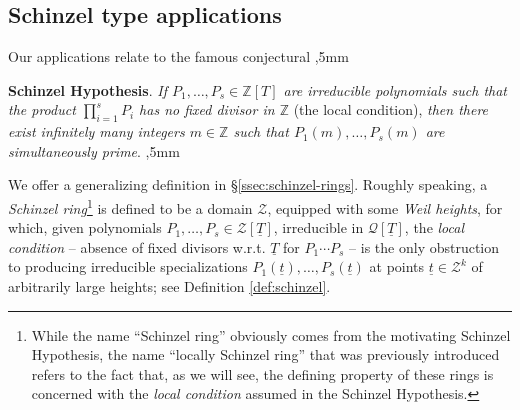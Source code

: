 \documentclass[11pt,a4paper,reqno]{amsart}
\def\Z{\mathbb{Z}}
\theoremstyle{definition}
\begin{document}
{\subsection{Schinzel type applications} Our applications relate to the famous conjectural 
,5mm

 \noindent
 {\bf Schinzel Hypothesis}.  \emph{If $P_1,\ldots,P_s\in \Z[T]$ are irreducible polynomials such that the product $\prod_{i=1}^s P_i$ has no fixed divisor in $\Z$} (the local condition), \emph{then there exist infinitely many integers $m\in \Z$ such that $P_1(m),\ldots,P_s(m)$ are simultaneously prime}. 
,5mm

We offer a generalizing definition in \S \ref{ssec:schinzel-rings}.
Roughly speaking, a \emph{Schinzel ring}\footnote{While the name ``Schinzel ring'' obviously comes from the motivating Schinzel Hypothesis, the name ``locally Schinzel ring'' that was previously introduced refers to the fact that, as we will see, the defining property of these rings is concerned with the \emph{local condition} assumed in the Schinzel Hypothesis.} is defined to be a domain ${\mathcal Z}$, equipped with some \emph{Weil heights}, for which, given polynomials $P_1,\ldots,P_s \in {\mathcal Z}[\underline T]$, irreducible in $\mathcal{Q}[\underline T]$, the \emph{local condition} -- absence of fixed divisors \hbox{w.r.t.} $\underline T$ for $P_1\cdots P_s$ -- is the only obstruction to producing irreducible specializations $P_1(\underline t), \ldots, P_s(\underline t)$ at points $\underline t\in {\mathcal Z}^k$ of arbitrarily large heights;
see Definition \ref{def:schinzel}.

}
\end{document}
